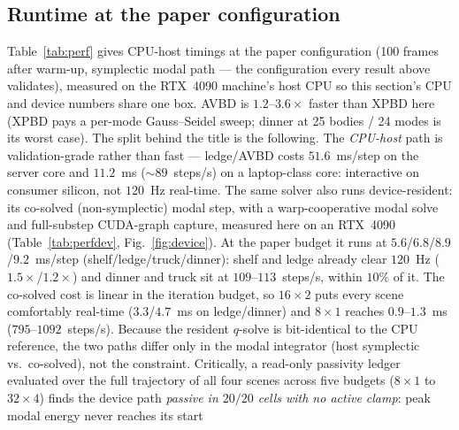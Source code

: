 \subsection{Runtime at the paper configuration}
\label{sec:results:perf}

Table~\ref{tab:perf} gives CPU-host timings at the paper configuration
(100 frames after warm-up, symplectic modal path --- the configuration every
result above validates), measured on the RTX~4090 machine's host CPU so this
section's CPU and device numbers share one box. AVBD is $1.2$--$3.6\times$
faster than XPBD here (XPBD pays a per-mode Gauss--Seidel sweep;
dinner at 25 bodies / 24 modes is its worst case). The split behind the title
is the following. The \emph{CPU-host} path is validation-grade rather than
fast --- ledge/AVBD costs $51.6$~ms/step on the server core and $11.2$~ms
(${\sim}89$~steps/s) on a laptop-class core: interactive on consumer
silicon, not $120$~Hz real-time. The
same solver also runs device-resident: its co-solved (non-symplectic) modal
step, with a warp-cooperative modal solve and full-substep CUDA-graph capture,
measured here on an RTX~4090 (Table~\ref{tab:perfdev}, Fig.~\ref{fig:device}). At the paper budget it
runs at $5.6$/$6.8$/$8.9$/$9.2$~ms/step (shelf/ledge/truck/dinner): shelf and
ledge already clear $120$~Hz ($1.5\times$/$1.2\times$) and dinner and truck sit
at $109$--$113$~steps/s, within $10\%$ of it. The co-solved cost is linear in
the iteration budget, so $16{\times}2$ puts every scene comfortably real-time
($3.3$/$4.7$~ms on ledge/dinner) and $8{\times}1$ reaches $0.9$--$1.3$~ms
($795$--$1092$~steps/s). Because the resident $q$-solve is bit-identical to the
CPU reference, the two paths differ only in the modal integrator (host
symplectic vs.\ co-solved), not the constraint. Critically, a read-only
passivity ledger evaluated over the full trajectory of all four scenes across five
budgets ($8{\times}1$ to $32{\times}4$) finds the device path \emph{passive in
$20/20$ cells with no active clamp}: peak modal energy never reaches its start
